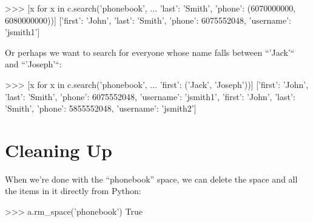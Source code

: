\begin{pythoncode}
   >>> [x for x in c.search('phonebook',
   ...  {'last': 'Smith', 'phone': (6070000000, 6080000000)})]
   [{'first': 'John',
     'last': 'Smith',
     'phone': 6075552048,
     'username': 'jsmith1'}]
\end{pythoncode}

Or perhaps we want to search for everyone whose name falls between ``'Jack'``
and ``'Joseph'``:

\begin{pythoncode}
>>> [x for x in c.search('phonebook',
...  {'first': ('Jack', 'Joseph')})]
[{'first': 'John',
  'last': 'Smith',
  'phone': 6075552048,
  'username': 'jsmith1'},
 {'first': 'John',
  'last': 'Smith',
  'phone': 5855552048,
  'username': 'jsmith2'}]
\end{pythoncode}

\section{Cleaning Up}

When we're done with the ``phonebook'' space, we can delete the space and all
the items in it directly from Python:

\begin{pythoncode}
>>> a.rm_space('phonebook')
True
\end{pythoncode}
